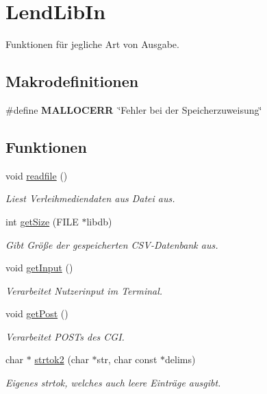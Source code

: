 \hypertarget{group___lend_lib_in}{}\section{Lend\+Lib\+In}
\label{group___lend_lib_in}


Funktionen für jegliche Art von Ausgabe.  


\subsection*{Makrodefinitionen}
\begin{DoxyCompactItemize}
\item 
\#define {\bfseries M\+A\+L\+L\+O\+C\+E\+RR}~\char`\"{}Fehler bei der Speicherzuweisung\char`\"{}\hypertarget{group___lend_lib_in_gafea163490cd0596e2677096aaf92a74f}{}\label{group___lend_lib_in_gafea163490cd0596e2677096aaf92a74f}

\end{DoxyCompactItemize}
\subsection*{Funktionen}
\begin{DoxyCompactItemize}
\item 
void \hyperlink{group___lend_lib_in_gabd7e68463503c5745a70e1d19c66f812}{readfile} ()
\begin{DoxyCompactList}\small\item\em Liest Verleihmediendaten aus Datei aus. \end{DoxyCompactList}\item 
int \hyperlink{group___lend_lib_in_ga6630e38513358b73fa2ce1c1f6cb71cb}{get\+Size} (F\+I\+LE $\ast$libdb)
\begin{DoxyCompactList}\small\item\em Gibt Größe der gespeicherten C\+S\+V-\/\+Datenbank aus. \end{DoxyCompactList}\item 
void \hyperlink{group___lend_lib_in_ga46d47190cb20b54826fb665f1859968f}{get\+Input} ()
\begin{DoxyCompactList}\small\item\em Verarbeitet Nutzerinput im Terminal. \end{DoxyCompactList}\item 
void \hyperlink{group___lend_lib_in_ga1817e73244fbbe5d1ae571f6010404ee}{get\+Post} ()
\begin{DoxyCompactList}\small\item\em Verarbeitet P\+O\+S\+Ts des C\+GI. \end{DoxyCompactList}\item 
char $\ast$ \hyperlink{group___lend_lib_in_gaccb55b34bbc589d5c47830fdcd889e17}{strtok2} (char $\ast$str, char const $\ast$delims)
\begin{DoxyCompactList}\small\item\em Eigenes strtok, welches auch leere Einträge ausgibt. \end{DoxyCompactList}\end{DoxyCompactItemize}
